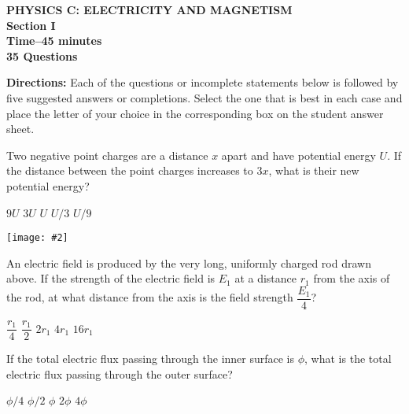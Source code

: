 \documentclass[12pt]{exam}
\newcommand{\pic}[2]{\texttt{[image: \#2]}}
\begin{document}
\begin{center}
  \textbf{PHYSICS C: ELECTRICITY AND MAGNETISM\\
    Section I\\
    Time--45 minutes\\
    35 Questions
  }
\end{center}
\raggedcolumns

\textbf{Directions:} Each of the questions or incomplete statements below is
followed by five suggested answers or completions. Select the one that is best
in each case and place the letter of your choice in the corresponding box on
the student answer sheet.

\begin{questions}
  \question Two negative point charges are a distance $x$ apart and have
  potential energy $U$. If the distance between the point charges increases to
  $3x$, what is their new potential energy?
  \begin{choices}
    \choice $9U$
    \choice $3U$
    \choice $U$
    \choice $U/3$
    \choice $U/9$
  \end{choices}

  \begin{center}
    \pic{.3}{rod1}
  \end{center}
  \question An electric field is produced by the very long, uniformly charged
  rod drawn above. If the strength of the electric field is $E_1$ at a distance
  $r_1$ from the axis of the rod, at what distance from the axis is
  the field strength $\dfrac{E_1}4$?
  \begin{choices}
    \choice $\dfrac{r_1}4$
    \choice  $\dfrac{r_1}2$
    \choice $2r_1$
    \choice $4r_1$
    \choice $16r_1$
  \end{choices}
  

  \question If the total electric flux passing through the inner surface is
  $\phi$, what is the total electric flux passing through the outer surface?
  \begin{choices}
    \choice $\phi/4$
    \choice $\phi/2$
    \choice $\phi$
    \choice $2\phi$
    \choice $4\phi$
  \end{choices}
  \label{sphere1}
  

\end{questions}
\end{document}
